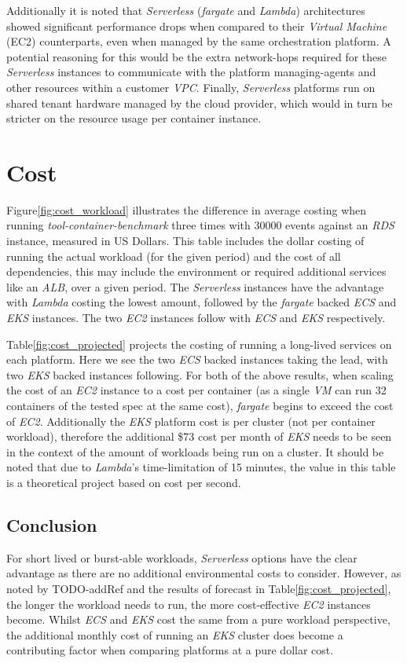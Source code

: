 Additionally it is noted that \textit{Serverless} (\textit{fargate} and \textit{Lambda})
architectures showed significant performance drops when compared to their \textit{Virtual Machine} (EC2) counterparts,
even when managed by the same orchestration platform.
A potential reasoning for this would be the extra network-hops required for these \textit{Serverless}
instances to communicate with the platform managing-agents and other resources within a customer \textit{VPC}.
Finally, \textit{Serverless} platforms run on shared tenant hardware managed by the cloud provider,
which would in turn be stricter on the resource usage per container instance.

\section{Cost}
Figure\ref{fig:cost_workload} illustrates the difference in average costing when running \emph{tool-container-benchmark} three times with 30000 events against an \textit{RDS} instance, measured in US Dollars.
This table includes the dollar costing of running the actual workload (for the given period) and the cost of all dependencies,
this may include the environment or required additional services like an \textit{ALB}, over a given period.
The \textit{Serverless} instances have the advantage with \textit{Lambda} costing the lowest amount, followed by the \textit{fargate} backed \textit{ECS} and \textit{EKS} instances.
The two \textit{EC2} instances follow with \textit{ECS} and \textit{EKS} respectively.

Table\ref{fig:cost_projected} projects the costing of running a long-lived services on each platform. Here we see the two \textit{ECS} backed instances taking the lead,
with two \textit{EKS} backed instances following. For both of the above results, when scaling the cost of an \textit{EC2} instance to a cost per container
(as a single \textit{VM} can run 32 containers of the tested spec at the same cost), \textit{fargate} begins to exceed the cost of \textit{EC2}.
Additionally the \textit{EKS} platform cost is per cluster (not per container workload), therefore the additional \$73 cost per month of \textit{EKS} needs to be seen in the context of the amount of workloads being run on a cluster.
It should be noted that due to \textit{Lambda}'s time-limitation of 15 minutes, the value in this table is a theoretical project based on cost per second.

\subsection*{Conclusion}
For short lived or burst-able workloads, \textit{Serverless} options have the clear advantage as there are no additional environmental costs to consider.
However, as noted by TODO-addRef and the results of forecast in Table\ref{fig:cost_projected}, the longer the workload needs to run, the more cost-effective \textit{EC2} instances become.
Whilst \textit{ECS} and \textit{EKS} cost the same from a pure workload perspective, the additional monthly cost of running an \textit{EKS} cluster does become a contributing factor
when comparing platforms at a pure dollar cost.

